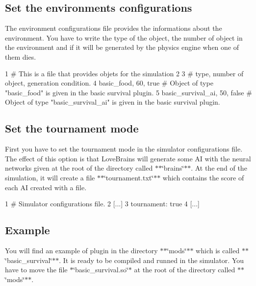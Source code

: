 \subsection*{Set the environment\textquotesingle{}s configurations}

The environment configurations file provides the informations about the environment. You have to write the type of the object, the number of object in the environment and if it will be generated by the physics engine when one of them dies.


\begin{DoxyCode}
1 # This is a file that provides objets for the simulation
2 
3 # type, number of object, generation condition.
4 basic\_food, 60, true # Object of type "basic\_food" is given in the basic survival plugin.
5 basic\_survival\_ai, 50, false # Object of type "basic\_survival\_ai" is given in the basic survival plugin.
\end{DoxyCode}


\subsection*{Set the tournament mode}

First you have to set the tournament mode in the simulator configurations file. The effect of this option is that Love\+Brains will generate some A\+I with the neural networks given at the root of the directory called $\ast$$\ast$\char`\"{}brains\char`\"{}$\ast$$\ast$. At the end of the simulation, it will create a file $\ast$$\ast$\char`\"{}tournament.\+txt\char`\"{}$\ast$$\ast$ which contains the score of each A\+I created with a file.


\begin{DoxyCode}
1 # Simulator configurations file.
2 [...]
3 tournament: true
4 [...]
\end{DoxyCode}


\subsection*{Example}

You will find an example of plugin in the directory $\ast$$\ast$\char`\"{}mods\char`\"{}$\ast$$\ast$ which is called $\ast$$\ast$\char`\"{}basic\+\_\+survival\char`\"{}$\ast$$\ast$. It is ready to be compiled and runned in the simulator. You have to move the file $\ast$\char`\"{}basic\+\_\+survival.\+so\char`\"{}$\ast$ at the root of the directory called $\ast$$\ast$\char`\"{}mods\char`\"{}$\ast$$\ast$.

